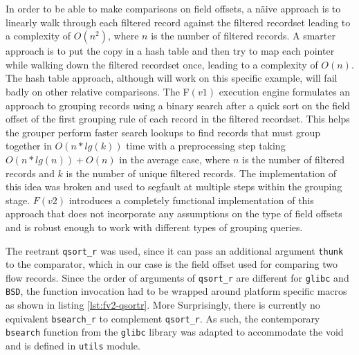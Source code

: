 In order to be able to make comparisons on field offsets, a n\"aive approach
is to linearly walk through each filtered record against the filtered
recordset leading to a complexity of $O(n^2)$, where $n$ is the number of
filtered records. A smarter approach is to put the copy in a hash table and
then try to map each pointer while walking down the filtered recordset once,
leading to a complexity of $O(n)$. The hash table approach, although will work
on this specific example, will fail badly on other relative comparisons. The
F$(v1)$  execution
engine \cite{jschauer:thesis:2011} formulates an approach to grouping records
using a binary search after a quick sort on the field offset of the first
grouping rule of each record in the filtered recordset. This helps the grouper
perform faster search lookups to find records that must group together in
$O(n*lg(k))$ time with a preprocessing step taking $O(n*lg(n)) + O(n)$ in the
average case, where $n$ is the number of filtered records and $k$ is the
number of unique filtered records.  The implementation of this idea was broken
and used to segfault at multiple steps within the grouping stage.  $F(v2)$
introduces a completely functional implementation of this approach that does
not incorporate any assumptions on the type of field offsets and is robust
enough to work with different types of grouping queries.

The reetrant \texttt{qsort\_r} was used, since it can pass an additional
argument \texttt{thunk} to the comparator, which in our case is the field
offset used for  comparing
two flow records. Since the order of arguments of \texttt{qsort\_r} are
different for \texttt{glibc} and \texttt{BSD}, the function invocation had to
be wrapped around platform specific macros as shown in listing
\ref{lst:fv2-qsortr}. More Surprisingly, there is currently no equivalent
\texttt{bsearch\_r} to complement \texttt{qsort\_r}. As such, the contemporary
\texttt{bsearch} function from the \texttt{glibc} library was adapted to
accommodate the void and is defined in \texttt{utils} module.

